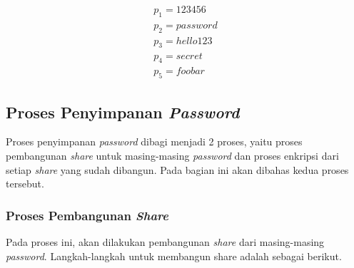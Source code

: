 \begin{gather}
	p_1 = 123456 \label{eq:passwords1} \\
	p_2 = password \label{eq:passwords2} \\
	p_3 = hello123 \label{eq:passwords3} \\
	p_4 = secret \label{eq:passwords4} \\
	p_5 = foobar \label{eq:passwords5}
\end{gather}

\subsection{Proses Penyimpanan \textit{Password}}\label{subsec:simpanpassword}

Proses penyimpanan \textit{password} dibagi menjadi 2 proses, yaitu proses pembangunan \textit{share} untuk masing-masing \textit{password} dan proses enkripsi dari setiap \textit{share} yang sudah dibangun. Pada bagian ini akan dibahas kedua proses tersebut.

\subsubsection{Proses Pembangunan \textit{Share}}

Pada proses ini, akan dilakukan pembangunan \textit{share} dari masing-masing \textit{password}. Langkah-langkah untuk membangun share adalah sebagai berikut.

